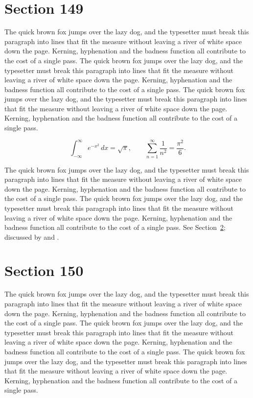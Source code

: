 \documentclass{article}
\begin{document}
\section{Section 149}
\label{sec:149}
The quick brown fox jumps over the lazy dog, and the typesetter must break this paragraph into lines that fit the measure without leaving a river of white space down the page. Kerning, hyphenation and the badness function all contribute to the cost of a single pass. The quick brown fox jumps over the lazy dog, and the typesetter must break this paragraph into lines that fit the measure without leaving a river of white space down the page. Kerning, hyphenation and the badness function all contribute to the cost of a single pass. The quick brown fox jumps over the lazy dog, and the typesetter must break this paragraph into lines that fit the measure without leaving a river of white space down the page. Kerning, hyphenation and the badness function all contribute to the cost of a single pass. 

\begin{equation}\label{eq:149}
\int_{-\infty}^{\infty} e^{-x^{2}}\,dx = \sqrt{\pi}, \qquad
\sum_{n=1}^{\infty} \frac{1}{n^{2}} = \frac{\pi^{2}}{6}.
\end{equation}

The quick brown fox jumps over the lazy dog, and the typesetter must break this paragraph into lines that fit the measure without leaving a river of white space down the page. Kerning, hyphenation and the badness function all contribute to the cost of a single pass. The quick brown fox jumps over the lazy dog, and the typesetter must break this paragraph into lines that fit the measure without leaving a river of white space down the page. Kerning, hyphenation and the badness function all contribute to the cost of a single pass. 
See Section~\ref{sec:150}; discussed by \textcite{k5} and \textcite{l2}.
\section{Section 150}
\label{sec:150}
The quick brown fox jumps over the lazy dog, and the typesetter must break this paragraph into lines that fit the measure without leaving a river of white space down the page. Kerning, hyphenation and the badness function all contribute to the cost of a single pass. The quick brown fox jumps over the lazy dog, and the typesetter must break this paragraph into lines that fit the measure without leaving a river of white space down the page. Kerning, hyphenation and the badness function all contribute to the cost of a single pass. The quick brown fox jumps over the lazy dog, and the typesetter must break this paragraph into lines that fit the measure without leaving a river of white space down the page. Kerning, hyphenation and the badness function all contribute to the cost of a single pass. 
\end{document}
